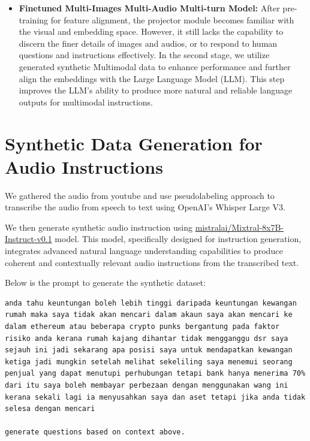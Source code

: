 \documentclass[preprint]{article}
\begin{document}
\begin{itemize}
  \item \textbf{Finetuned Multi-Images Multi-Audio Multi-turn Model:} After pre-training for feature alignment, the projector module becomes familiar with the visual and embedding space. However, it still lacks the capability to discern the finer details of images and audios, or to respond to human questions and instructions effectively. In the second stage, we utilize generated synthetic Multimodal data to enhance performance and further align the embeddings with the Large Language Model (LLM). This step improves the LLM's ability to produce more natural and reliable language outputs for multimodal instructions.

\end{itemize}

\section{Synthetic Data Generation for Audio Instructions}

We gathered the audio from youtube and use pseudolabeling approach to transcribe the audio from speech to text using OpenAI's Whisper Large V3.

We then generate synthetic audio instruction using \href{https://huggingface.co/mistralai/Mixtral-8x7B-Instruct-v0.1}{mistralai/Mixtral-8x7B-Instruct-v0.1} model. This model, specifically designed for instruction generation, integrates advanced natural language understanding capabilities to produce coherent and contextually relevant audio instructions from the transcribed text.

Below is the prompt to generate the synthetic dataset:

\begin{lstlisting}[breaklines=true]
anda tahu keuntungan boleh lebih tinggi daripada keuntungan kewangan rumah maka saya tidak akan mencari dalam akaun saya akan mencari ke dalam ethereum atau beberapa crypto punks bergantung pada faktor risiko anda kerana rumah kajang dihantar tidak mengganggu dsr saya sejauh ini jadi sekarang apa posisi saya untuk mendapatkan kewangan ketiga jadi mungkin setelah melihat sekeliling saya menemui seorang penjual yang dapat menutupi perhubungan tetapi bank hanya menerima 70% dari itu saya boleh membayar perbezaan dengan menggunakan wang ini kerana sekali lagi ia menyusahkan saya dan aset tetapi jika anda tidak selesa dengan mencari 
  
generate questions based on context above. 

\end{lstlisting}
\end{document}
